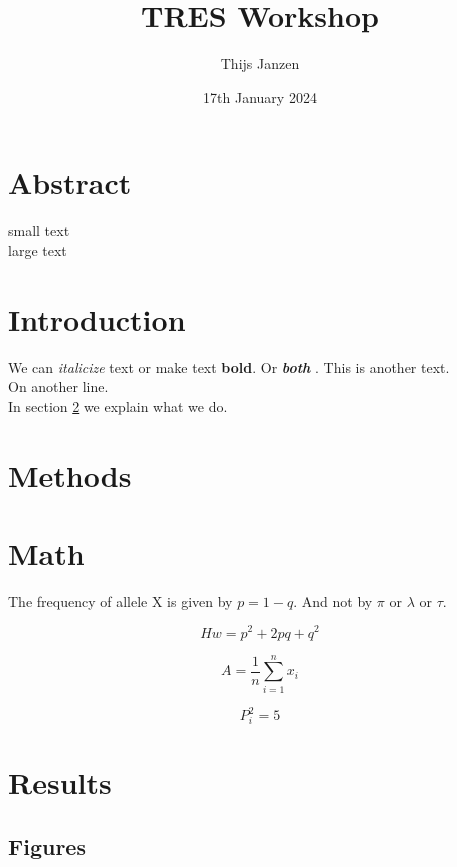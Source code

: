 \documentclass[10pt]{article}
\title{TRES Workshop}
\author{Thijs Janzen}
\date{17th January 2024}
\begin{document}
\maketitle

\newpage

\section*{Abstract}
{\tiny small text}\\
{\Huge large text}

\section{Introduction}
We can \textit{italicize} text or make text \textbf{bold}. Or \textit{ \textbf{both} }. \newline
This is another text. \\
On another line.\\
In section \ref{sec:methods} we explain what we do.

\section{Methods}\label{sec:methods}

\section*{Math}

The frequency of allele X is given by $p = 1 - q$. And not by $\pi$ or $\lambda$ or $\tau$.

\begin{equation}
Hw = p^2 + 2pq + q^2
\label{eq:hw}
\end{equation}

\begin{equation}
A = \frac{1}{n} \sum_{i=1}^n x_i
\label{eq:mean}
\end{equation}

\begin{equation}
P_i^2 = 5
\label{eq:1}
\end{equation}

\section{Results}
\subsection{Figures}
\end{document}
